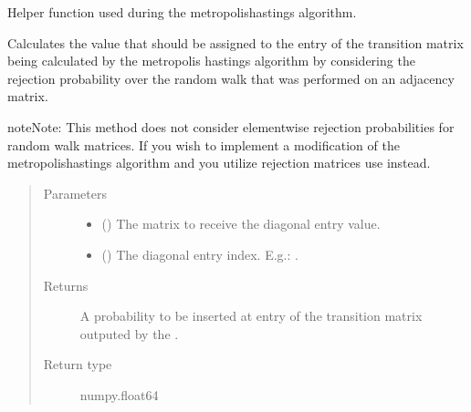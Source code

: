 \documentclass[letterpaper,10pt,english]{sphinxmanual}
\begin{document}
\begin{fulllineitems}
\label{\detokenize{app.domain.helpers:app.domain.helpers.matrices._get_diagonal_entry_probability_v2}}
Helper function used during the metropolis\sphinxhyphen{}hastings algorithm.

Calculates the value that should be assigned to the entry  of the
transition matrix being calculated by the metropolis hastings algorithm
by considering the rejection probability over the random walk that was
performed on an adjacency matrix.

\begin{sphinxadmonition}{note}{Note:}
This method does not consider element\sphinxhyphen{}wise rejection probabilities
for random walk matrices. If you wish to implement a modification of
the metropolis\sphinxhyphen{}hastings algorithm and you utilize rejection matrices
use {\hyperref[\detokenize{app.domain.helpers:app.domain.helpers.matrices._get_diagonal_entry_probability_v1}]{}} instead.
\end{sphinxadmonition}
\begin{quote}\begin{description}
\item[{Parameters}] \leavevmode\begin{itemize}
\item {} 
 () \textendash{} The matrix to receive the diagonal entry value.

\item {} 
 () \textendash{} The diagonal entry index. E.g.: .

\end{itemize}

\item[{Returns}] \leavevmode
A probability to be inserted at entry  of the transition matrix
outputed by the {\hyperref[\detokenize{app.domain.helpers:app.domain.helpers.matrices._metropolis_hastings}]{}}.

\item[{Return type}] \leavevmode
numpy.float64

\end{description}\end{quote}

\end{fulllineitems}
\end{document}
